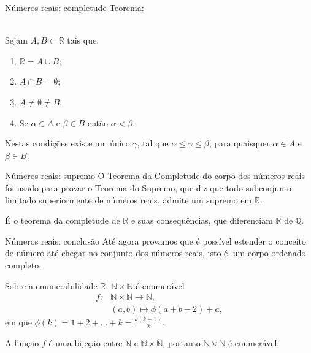 \documentclass[xcolor=dvipsnames]{beamer}
\begin{document}
\begin{frame}{Números reais: completude}
    Teorema: \\~\
    
    Sejam $A,B \subset \mathbb{R}$ tais que:
    \begin{enumerate}
        \item $\mathbb{R} = A \cup B$;
        \item $A \cap B = \emptyset$;
        \item $A \neq \emptyset \neq B$;
        \item Se $\alpha \in A$ e $\beta \in B$ então $\alpha < \beta$.
    \end{enumerate}
    Nestas condições existe um único $\gamma$, tal que $\alpha \leq \gamma \leq \beta$, para quaisquer $\alpha \in A$ e $\beta \in B$.
\end{frame}

\begin{frame}{Números reais: supremo}
    O Teorema da Completude do corpo dos números reais foi usado para provar o Teorema do Supremo, que diz que todo subconjunto limitado superiormente de números reais, admite um supremo em $\mathbb{R}$. 

    É o teorema da completude de $\mathbb{R}$ e suas consequências, que diferenciam $\mathbb{R}$ de $\mathbb{Q}$.
\end{frame}

\begin{frame}{Números reais: conclusão}
    Até agora provamos que é possível estender o conceito de número até chegar no conjunto dos números reais, isto é, um corpo ordenado completo.
\end{frame}


\begin{frame}{Sobre a enumerabilidade $\mathbb{R}$: $\mathbb{N} \times \mathbb{N}$ é enumerável}
    \begin{align*}
        f \colon &\mathbb{N} \times \mathbb{N} \to \mathbb{N}, \\
        &(a,b) \mapsto \phi(a+b-2) + a,
    \end{align*}
    em que $\phi(k) = 1 + 2 + ... + k = \frac{k(k+1)}{2}.$.

    A função $f$ é uma bijeção entre $\mathbb{N}$ e $\mathbb{N} \times \mathbb{N}$, portanto $\mathbb{N} \times \mathbb{N}$ é enumerável.
\end{frame}
\end{document}
